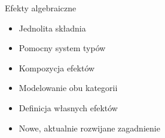 \documentclass{beamer}
\begin{document}
\begin{frame}[fragile]{Efekty algebraiczne}
  \begin{itemize}
    \item Jednolita składnia
    \item Pomocny system typów%
    \item Kompozycja efektów
    \item Modelowanie obu kategorii
    \item Definicja własnych efektów
    \item Nowe, aktualnie rozwijane zagadnienie
  \end{itemize}
\end{frame}





\end{document}

